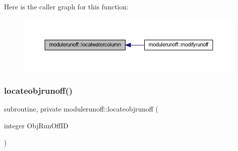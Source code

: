 Here is the caller graph for this function\+:
\nopagebreak
\begin{figure}[H]
\begin{center}
\leavevmode
\includegraphics[width=350pt]{namespacemodulerunoff_abd7df3c244fbd0c4171c796df0f50906_icgraph}
\end{center}
\end{figure}
\mbox{\label{namespacemodulerunoff_a573ec5acc76c43856a82166862259a60}} 
\subsubsection{\texorpdfstring{locateobjrunoff()}{locateobjrunoff()}}
{\footnotesize\ttfamily subroutine, private modulerunoff\+::locateobjrunoff (\begin{DoxyParamCaption}\item[{integer}]{Obj\+Run\+Off\+ID }\end{DoxyParamCaption})\hspace{0.3cm}{\ttfamily [private]}}

